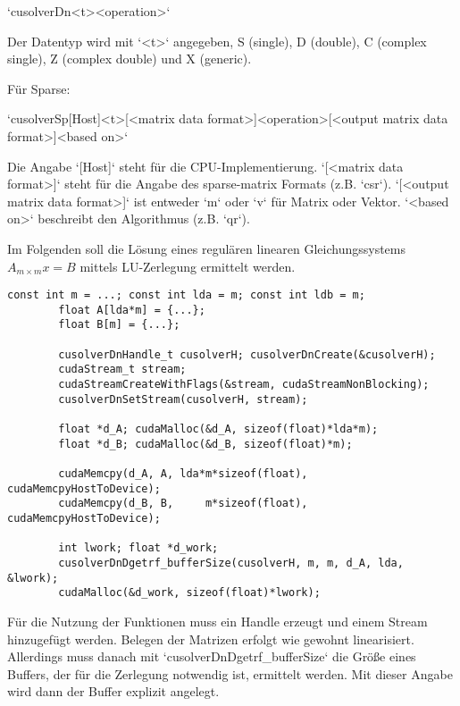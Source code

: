 		\li`cusolverDn<t><operation>` 

		Der Datentyp wird mit \li`<t>` angegeben, S (single), D (double), C (complex single), Z (complex double) und X (generic). 
		
		Für Sparse:
		
		\li`cusolverSp[Host]<t>[<matrix data format>]<operation>[<output matrix data format>]<based on>`
		
		Die Angabe \li`[Host]` steht für die CPU-Implementierung. \li`[<matrix data format>]` steht für die Angabe des sparse-matrix Formats (z.B. \li`csr`). \li`[<output matrix data format>]` ist entweder \li`m` oder \li`v` für Matrix oder Vektor. \li`<based on>` beschreibt den Algorithmus (z.B. \li`qr`).
		
		Im Folgenden soll die Lösung eines regulären linearen Gleichungssystems $A_{m\times m}x=B$ mittels LU-Zerlegung ermittelt werden.
		
		\begin{lstlisting}[caption=cuSOLVER: Buffer]
		const int m = ...; const int lda = m; const int ldb = m;
		float A[lda*m] = {...};
		float B[m] = {...};    

		cusolverDnHandle_t cusolverH; cusolverDnCreate(&cusolverH);
		cudaStream_t stream;
		cudaStreamCreateWithFlags(&stream, cudaStreamNonBlocking);
		cusolverDnSetStream(cusolverH, stream);

		float *d_A; cudaMalloc(&d_A, sizeof(float)*lda*m);
		float *d_B; cudaMalloc(&d_B, sizeof(float)*m);

		cudaMemcpy(d_A, A, lda*m*sizeof(float), cudaMemcpyHostToDevice);
		cudaMemcpy(d_B, B,     m*sizeof(float), cudaMemcpyHostToDevice);

		int lwork; float *d_work; 
		cusolverDnDgetrf_bufferSize(cusolverH, m, m, d_A, lda, &lwork);
		cudaMalloc(&d_work, sizeof(float)*lwork);
		\end{lstlisting}
		
		Für die Nutzung der Funktionen muss ein \Gls{Handle} erzeugt und einem \Gls{Stream} hinzugefügt werden. Belegen der Matrizen erfolgt wie gewohnt linearisiert. Allerdings muss danach mit \li`cusolverDnDgetrf_bufferSize` die Größe eines Buffers, der für die Zerlegung notwendig ist, ermittelt werden. Mit dieser Angabe wird dann der Buffer explizit angelegt.
		
